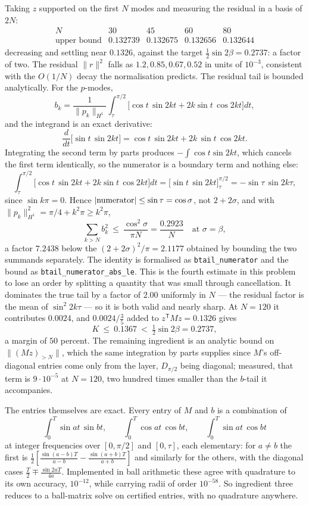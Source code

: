 \documentclass[11pt]{article}
\theoremstyle{definition}
\begin{document}
Taking $z$ supported on the first $N$ modes and measuring the residual in a basis of $2N$:
\[
  \begin{array}{r|cccc}
    N & 30 & 45 & 60 & 80\\\hline
    \text{upper bound} & 0.132739 & 0.132675 & 0.132656 & 0.132644
  \end{array}
\]
decreasing and settling near $0.1326$, against the target $\tfrac12\sin2\beta=0.2737$: a
factor of two. The residual $\|r\|^2$ falls as $1.2,0.85,0.67,0.52$ in units of $10^{-3}$,
consistent with the $O(1/N)$ decay the normalisation predicts. The residual tail is bounded analytically. For the $p$-modes,
\[
  b_k=\frac{1}{\|p_k\|_{H^1}}\int_\tau^{\pi/2}\bigl[\cos t\,\sin 2kt+2k\sin t\,\cos 2kt\bigr]dt ,
\]
and the integrand is an exact derivative:
\[
  \frac{d}{dt}\bigl[\sin t\,\sin 2kt\bigr]=\cos t\,\sin 2kt+2k\,\sin t\,\cos 2kt .
\]
Integrating the second term by parts produces $-\int\cos t\sin 2kt$, which cancels the
first term identically, so the numerator is a boundary term and nothing else:
\[
  \int_\tau^{\pi/2}\!\bigl[\cos t\,\sin 2kt+2k\sin t\,\cos 2kt\bigr]dt
   =\bigl[\sin t\,\sin 2kt\bigr]_\tau^{\pi/2}=-\sin\tau\,\sin 2k\tau ,
\]
since $\sin k\pi=0$. Hence $|{\rm numerator}|\le\sin\tau=\cos\sigma$, not $2+2\sigma$, and
with $\|p_k\|_{H^1}^2=\pi/4+k^2\pi\ge k^2\pi$,
\[
  \sum_{k>N}b_k^2\ \le\ \frac{\cos^2\sigma}{\pi N}=\frac{0.2923}{N}\quad\text{at }\sigma=\beta ,
\]
a factor $7.2438$ below the $(2+2\sigma)^2/\pi=2.1177$ obtained by bounding the two
summands separately. The identity is formalised as \texttt{btail\_numerator} and the bound
as \texttt{btail\_numerator\_abs\_le}. This is the fourth estimate in this problem to lose
an order by splitting a quantity that was small through cancellation.
It dominates the true tail by a factor of $2.00$ uniformly in $N$ --- the residual factor
is the mean of $\sin^2 2k\tau$ --- so it is both valid and nearly sharp. At $N=120$ it
contributes $0.0024$, and $0.0024/\tfrac35$ added to $z^{\mathsf T}Mz=0.1326$ gives
\[
  K\ \le\ 0.1367\ <\ \tfrac12\sin2\beta=0.2737 ,
\]
a margin of $50$ percent. The remaining ingredient is an analytic bound on
$\|(Mz)_{>N}\|$, which the same integration by parts supplies since $M$'s off-diagonal
entries come only from the layer, $D_{\pi/2}$ being diagonal; measured, that term is
$9\cdot10^{-5}$ at $N=120$, two hundred times smaller than the $b$-tail it accompanies.

The entries themselves are exact. Every entry of $M$ and $b$ is a combination of
\[
  \int_0^T\!\sin at\,\sin bt,\qquad \int_0^T\!\cos at\,\cos bt,\qquad
  \int_0^T\!\sin at\,\cos bt
\]
at integer frequencies over $[0,\pi/2]$ and $[0,\tau]$, each elementary: for $a\ne b$ the
first is $\tfrac12[\tfrac{\sin(a-b)T}{a-b}-\tfrac{\sin(a+b)T}{a+b}]$ and similarly for the
others, with the diagonal cases $\tfrac T2\mp\tfrac{\sin2aT}{4a}$. Implemented in ball
arithmetic these agree with quadrature to its own accuracy, $10^{-12}$, while carrying
radii of order $10^{-58}$. So ingredient three reduces to a ball-matrix solve on certified
entries, with no quadrature anywhere.
\end{document}
